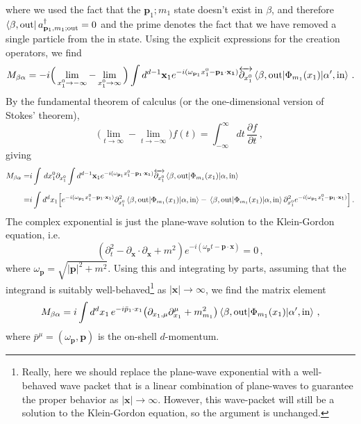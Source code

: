 \documentclass{article}
\numberwithin{equation}{subsection}
\begin{document}
where we used the fact that the $\mathbf{p}_1;m_1$ state doesn't exist in $\beta$, and therefore $\bra{\beta,\text{out}}a^\dag_{\mathbf{p}_1,m_1;\text{out}} = 0$ and the
prime denotes the fact that we have removed a single particle from the in state. Using the explicit expressions for the creation operators, we find
\begin{equation}
	M_{\beta\alpha} = -i\Big(\lim_{x_1^0\to-\infty} - \lim_{x_1^0\to\infty}\Big)\int d^{d-1}\mathbf{x}_1
	e^{-i(\omega_{\mathbf{p}_1}x_1^0 - \mathbf{p_1}\cdot\mathbf{x_1})}\overleftrightarrow{\partial_{x_1^0}}
	\mel{\beta,\text{out}}{\Phi_{m_1}(x_1)}{\alpha',\text{in}}\,.
\end{equation}
By the fundamental theorem of calculus (or the one-dimensional version of Stokes' theorem),
\begin{equation}
	\Big(\lim_{t\to\infty} - \lim_{t\to-\infty}\Big)f(t) = \int_{-\infty}^\infty dt\,\frac{\partial f}{\partial t}\,,
\end{equation}
giving
\begin{equation}\begin{split}
	M_{\beta\alpha} =& i\int\,dx_1^0\partial_{x_1^0}\int d^{d-1}\mathbf{x}_1
	e^{-i(\omega_{\mathbf{p}_1}x_1^0 - \mathbf{p_1}\cdot\mathbf{x_1})}\overleftrightarrow{\partial_{x_1^0}}
	\mel{\beta,\text{out}}{\Phi_{m_1}(x_1)}{\alpha,\text{in}}\\[0.5em]
	=&i\int d^dx_1\Big[e^{-i(\omega_{\mathbf{p}_1}x_1^0 - \mathbf{p}_1\cdot \mathbf{x}_1)}\partial_{x_1^0}^2\mel{\beta,\text{out}}{\Phi_{m_1}(x_1)}{\alpha,\text{in}}
	- \mel{\beta,\text{out}}{\Phi_{m_1}(x_1)}{\alpha,\text{in}}\partial_{x_1^0}^2e^{-i(\omega_{\mathbf{p}_1}x_1^0 - \mathbf{p}_1\cdot \mathbf{x}_1)}\Big]\,.
\end{split}\end{equation}
The complex exponential is just the plane-wave solution to the Klein-Gordon equation, i.e.
\begin{equation}
	(\partial_t^2 - \partial_{\mathbf{x}}\cdot\partial_{\mathbf{x}} + m^2)e^{-i(\omega_{\mathbf{p}}t - \mathbf{p}\cdot \mathbf{x})} = 0\,,
\end{equation}
where $\omega_{\mathbf{p}} = \sqrt{|\mathbf{p}|^2 + m^2}$. Using this and integrating by parts, assuming that the integrand is suitably 
well-behaved\footnote{Really, here we should replace the plane-wave exponential with a well-behaved wave packet that is a linear combination
of plane-waves to guarantee the proper behavior as $|\mathbf{x}|\to\infty$. However, this wave-packet will still be a solution to the Klein-Gordon
equation, so the argument is unchanged.} as $|\mathbf{x}|\to\infty$, we find the matrix element
\begin{equation}
	M_{\beta\alpha} = i\int d^dx_1\,e^{-i\bar{p}_1\cdot x_1}\big(\partial_{x_1,\mu}\partial_{x_1}^\mu + m_{m_1}^2\big)\mel{\beta,\text{out}}{\Phi_{m_1}(x_1)}{\alpha',\text{in}}\,,
\end{equation}
where $\bar{p}^\mu = (\omega_{\mathbf{p}},\mathbf{p})$ is the on-shell $d$-momentum.
\end{document}
